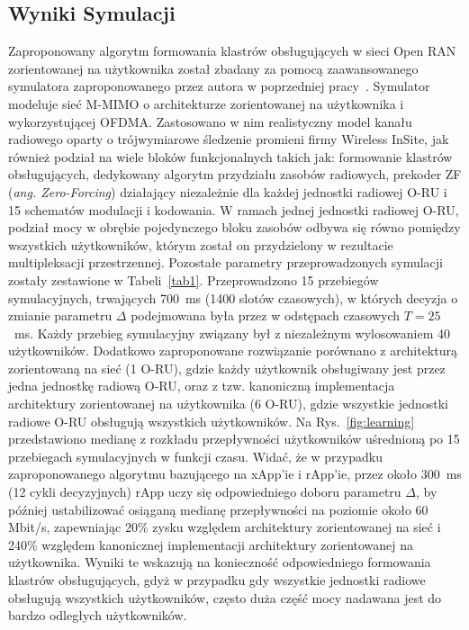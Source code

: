 \documentclass[a4paper]{article}
\begin{document}
\begin{multicols}{2}
\section{Wyniki Symulacji} \label{sec:results}
Zaproponowany algorytm formowania klastrów obsługujących w sieci Open RAN zorientowanej na użytkownika został zbadany za pomocą zaawansowanego symulatora zaproponowanego przez autora w poprzedniej pracy~\cite{hoffmann2024}. Symulator modeluje sieć M-MIMO o architekturze zorientowanej na użytkownika i wykorzystującej OFDMA. Zastosowano w nim realistyczny model kanału radiowego oparty o trójwymiarowe śledzenie promieni firmy Wireless InSite, jak również podział na wiele bloków funkcjonalnych takich jak: formowanie klastrów obsługujących, dedykowany algorytm przydziału zasobów radiowych, prekoder ZF (\textit{ang. Zero-Forcing}) działający niezależnie dla każdej jednostki radiowej O-RU i 15 schematów modulacji i kodowania. W ramach jednej jednostki radiowej O-RU, podział mocy w obrębie pojedynczego bloku zasobów odbywa się równo pomiędzy wszystkich użytkowników, którym został on przydzielony w rezultacie multipleksacji przestrzennej. Pozostałe parametry przeprowadzonych symulacji zostały zestawione w Tabeli~\ref{tab1}. Przeprowadzono 15 przebiegów symulacyjnych, trwających 700~ms (1400 slotów czasowych), w których decyzja o zmianie parametru $\Delta$ podejmowana była przez w odstępach czasowych $T=25$~ms. Każdy przebieg symulacyjny związany był z niezależnym wylosowaniem 40 użytkowników. Dodatkowo zaproponowane rozwiązanie porównano z architekturą zorientowaną na sieć (1 O-RU), gdzie każdy użytkownik obsługiwany jest przez jedna jednostkę radiową O-RU, oraz z tzw. kanoniczną implementacja architektury zorientowanej na użytkownika (6 O-RU), gdzie wszystkie jednostki radiowe O-RU obsługują wszystkich użytkowników. Na Rys.~\ref{fig:learning} przedstawiono medianę z rozkładu przepływności użytkowników uśrednioną po 15 przebiegach symulacyjnych w funkcji czasu. Widać, że w przypadku zaproponowanego algorytmu bazującego na xApp'ie i rApp'ie, przez około 300~ms (12 cykli decyzyjnych) rApp uczy się odpowiedniego doboru parametru $\Delta$, by później ustabilizować osiąganą medianę przepływności na poziomie około 60 Mbit/s, zapewniając $20$\% zysku względem architektury zorientowanej na sieć i 240\% względem kanonicznej implementacji architektury zorientowanej na użytkownika. Wyniki te wskazują na konieczność odpowiedniego formowania klastrów obsługujących, gdyż w przypadku gdy wszystkie jednostki radiowe obsługują wszystkich użytkowników, często duża część mocy nadawana jest do bardzo odległych użytkowników. 

\end{multicols}
\end{document}
